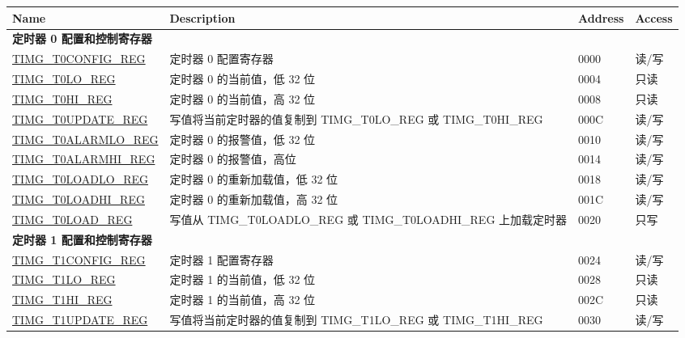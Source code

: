 \begin{longtable}{ | p{6cm} | p{7.2cm} | p{1.3cm} | p{1cm} | }
\hline\rowcolor{lightgray}
Name & Description &  Address & Access \\ \hline
\endhead
\multicolumn{4}{|l|}{\textbf{定时器 0 配置和控制寄存器}} \\ \hline
\hyperref[regdesc:TIMGTXCONFIGREG]{TIMG\_T0CONFIG\_REG} & 定时器 0 配置寄存器 & \hexprefix{}0000 & 读/写 \\ \hline
\hyperref[regdesc:TIMGTXLOREG]{TIMG\_T0LO\_REG} & 定时器 0 的当前值，低 32 位 & \hexprefix{}0004 & 只读 \\ \hline
\hyperref[regdesc:TIMGTXHIREG]{TIMG\_T0HI\_REG} & 定时器 0 的当前值，高 32 位 & \hexprefix{}0008 & 只读 \\ \hline
\hyperref[regdesc:TIMGTXUPDATEREG]{TIMG\_T0UPDATE\_REG} & 写值将当前定时器的值复制到 TIMG\_T0LO\_REG 或 TIMG\_T0HI\_REG & \hexprefix{}000C & 读/写 \\ \hline
\hyperref[regdesc:TIMGTXALARMLOREG]{TIMG\_T0ALARMLO\_REG} & 定时器 0 的报警值，低 32 位 & \hexprefix{}0010 & 读/写 \\ \hline
\hyperref[regdesc:TIMGTXALARMHIREG]{TIMG\_T0ALARMHI\_REG} & 定时器 0 的报警值，高位 & \hexprefix{}0014 & 读/写 \\ \hline
\hyperref[regdesc:TIMGTXLOADLOREG]{TIMG\_T0LOADLO\_REG} & 定时器 0 的重新加载值，低 32 位 & \hexprefix{}0018 & 读/写 \\ \hline
\hyperref[regdesc:TIMGTXLOADHIREG]{TIMG\_T0LOADHI\_REG} & 定时器 0 的重新加载值，高 32 位 & \hexprefix{}001C & 读/写 \\ \hline
\hyperref[regdesc:TIMGTXLOADREG]{TIMG\_T0LOAD\_REG} & 写值从 TIMG\_T0LOADLO\_REG 或 TIMG\_T0LOADHI\_REG 上加载定时器 & \hexprefix{}0020 & 只写 \\ \hline
\multicolumn{4}{|l|}{\textbf{定时器 1 配置和控制寄存器}} \\ \hline
\hyperref[regdesc:TIMGTXCONFIGREG]{TIMG\_T1CONFIG\_REG} & 定时器 1 配置寄存器 & \hexprefix{}0024 & 读/写 \\ \hline
\hyperref[regdesc:TIMGTXLOREG]{TIMG\_T1LO\_REG} & 定时器 1 的当前值，低 32 位 & \hexprefix{}0028 & 只读 \\ \hline
\hyperref[regdesc:TIMGTXHIREG]{TIMG\_T1HI\_REG} & 定时器 1 的当前值，高 32 位 & \hexprefix{}002C & 只读 \\ \hline
\hyperref[regdesc:TIMGTXUPDATEREG]{TIMG\_T1UPDATE\_REG} & 写值将当前定时器的值复制到 TIMG\_T1LO\_REG 或 TIMG\_T1HI\_REG & \hexprefix{}0030 & 读/写 \\ \hline

\end{longtable}
